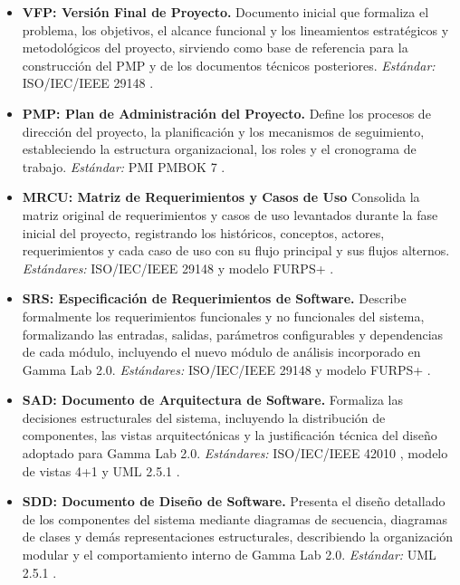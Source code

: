 \documentclass{article}
\begin{document}
\begin{itemize}[label={}]
    \item \textbf{VFP: Versión Final de Proyecto.}
    Documento inicial que formaliza el problema, los objetivos, el alcance funcional y los lineamientos estratégicos y metodológicos del proyecto, sirviendo como base de referencia para la construcción del PMP y de los documentos técnicos posteriores. \textit{Estándar:} ISO/IEC/IEEE 29148 \cite{iso29148}.

    \item \textbf{PMP: Plan de Administración del Proyecto.}
    Define los procesos de dirección del proyecto, la planificación y los mecanismos de seguimiento, estableciendo la estructura organizacional, los roles y el cronograma de trabajo. \textit{Estándar:} PMI PMBOK 7 \cite{pmbok7}.

    \item \textbf{MRCU: Matriz de Requerimientos y Casos de Uso }
    Consolida la matriz original de requerimientos y casos de uso levantados durante la fase inicial del proyecto, registrando los históricos, conceptos, actores, requerimientos y cada caso de uso con su flujo principal y sus flujos alternos. \textit{Estándares:} ISO/IEC/IEEE 29148 \cite{iso29148} y modelo FURPS+ \cite{eeles2001}.

    \item \textbf{SRS: Especificación de Requerimientos de Software.}
    Describe formalmente los requerimientos funcionales y no funcionales del sistema, formalizando las entradas, salidas, parámetros configurables y dependencias de cada módulo, incluyendo el nuevo módulo de análisis incorporado en Gamma Lab 2.0. \textit{Estándares:} ISO/IEC/IEEE 29148 \cite{iso29148} y modelo FURPS+ \cite{eeles2001}.

    \item \textbf{SAD: Documento de Arquitectura de Software.}
    Formaliza las decisiones estructurales del sistema, incluyendo la distribución de componentes, las vistas arquitectónicas y la justificación técnica del diseño adoptado para Gamma Lab 2.0. \textit{Estándares:} ISO/IEC/IEEE 42010 \cite{iso42010}, modelo de vistas 4+1 \cite{kruchten1995} y UML 2.5.1 \cite{omg_uml}.

    \item \textbf{SDD: Documento de Diseño de Software.}
    Presenta el diseño detallado de los componentes del sistema mediante diagramas de secuencia, diagramas de clases y demás representaciones estructurales, describiendo la organización modular y el comportamiento interno de Gamma Lab 2.0. \textit{Estándar:} UML 2.5.1 \cite{omg_uml}.


\end{itemize}
\end{document}
